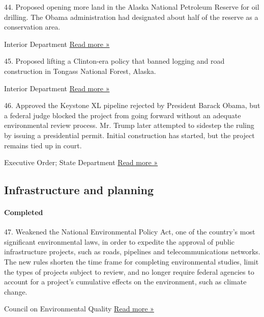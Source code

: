 44. Proposed opening more land in the Alaska National Petroleum Reserve
for oil drilling. The Obama administration had designated about half of
the reserve as a conservation area.

 Interior Department \textbar{}
\href{https://www.reuters.com/article/us-usa-alaska-oil/u-s-government-releases-draft-proposal-for-expanded-alaska-oil-development-idUSKBN1XW1SK}{Read
more »}

45. Proposed lifting a Clinton-era policy that banned logging and road
construction in Tongass National Forest, Alaska.

 Interior Department \textbar{}
\href{https://www.nytimes3xbfgragh.onion/2019/10/15/climate/tongass-forest-roads.html}{Read
more »}

46. Approved the Keystone XL pipeline rejected by President Barack
Obama, but a federal judge blocked the project from going forward
without an adequate environmental review process. Mr. Trump later
attempted to sidestep the ruling by issuing a presidential permit.
Initial construction has started, but the project remains tied up in
court.

 Executive Order; State Department \textbar{}
\href{https://www.pri.org/stories/2019-11-28/keystone-oil-spill-casts-doubt-safety-proposed-keystone-xl-pipeline}{Read
more »}

\hypertarget{infrastructure-and-planning}{%
\subsection{Infrastructure and
planning}\label{infrastructure-and-planning}}

\hypertarget{completed-2}{%
\paragraph{Completed}\label{completed-2}}

47. Weakened the National Environmental Policy Act, one of the country's
most significant environmental laws, in order to expedite the approval
of public infrastructure projects, such as roads, pipelines and
telecommunications networks. The new rules shorten the time frame for
completing environmental studies, limit the types of projects subject to
review, and no longer require federal agencies to account for a
project's cumulative effects on the environment, such as climate change.

 Council on Environmental Quality \textbar{}
\href{https://www.nytimes3xbfgragh.onion/2020/07/15/climate/trump-environment-nepa.html}{Read
more »}

